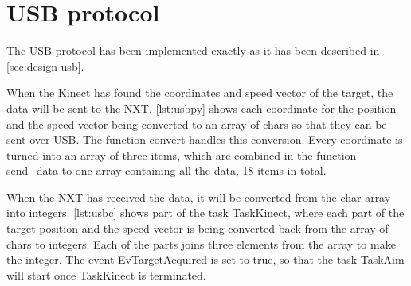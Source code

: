 \section{USB protocol}
The USB protocol has been implemented exactly as it has been described in \autoref{sec:design-usb}.

When the Kinect has found the coordinates and speed vector of the target, the data will be sent to the NXT. \autoref{lst:usbpy} shows each coordinate for the position and the speed vector being converted to an array of chars so that they can be sent over USB. The function convert handles this conversion. Every coordinate is turned into an array of three items, which are combined in the function send\_data to one array containing all the data, 18 items in total. 



When the NXT has received the data, it will be converted from the char array into integers. \autoref{lst:usbc} shows part of the task TaskKinect, where each part of the target position and the speed vector is being converted back from the array of chars to integers. Each of the parts joins three elements from the array to make the integer. 
The event EvTargetAcquired is set to true, so that the task TaskAim will start once TaskKinect is terminated.

